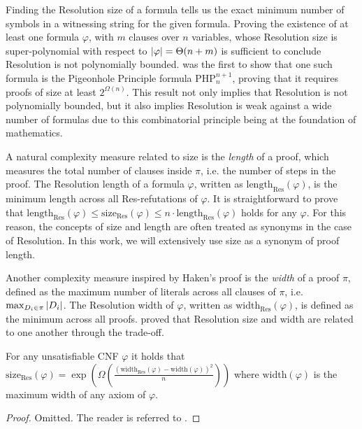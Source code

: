 Finding the Resolution size of a formula tells us the exact minimum number of symbols in a witnessing string for the given formula. Proving the existence of at least one formula $\varphi$, with $m$ clauses over $n$ variables, whose Resolution size is super-polynomial with respect to $\left|\varphi\right| = \Theta(n+m)$ is sufficient to conclude Resolution is not polynomially bounded. \textcite{haken} was the first to show that one such formula is the Pigeonhole Principle formula $\mathrm{PHP}^{n+1}_{n}$, proving that it requires proofs of size at least $2^{\Omega(n)}$. This result not only implies that Resolution is not polynomially bounded, but it also implies Resolution is weak against a wide number of formulas due to this combinatorial principle being at the foundation of mathematics. 

A natural complexity measure related to size is the \textit{length} of a proof, which measures the total number of clauses inside $\pi$, i.e. the number of steps in the proof. The Resolution length of a formula $\varphi$, written as $\mathrm{length}_{\mathrm{Res}}(\varphi)$, is the minimum length across all Res-refutations of $\varphi$. It is straightforward to prove that $\mathrm{length}_{\mathrm{Res}}(\varphi) \leq \mathrm{size}_{\mathrm{Res}}(\varphi) \leq n \cdot \mathrm{length}_{\mathrm{Res}}(\varphi)$ holds for any $\varphi$. For this reason, the concepts of size and length are often treated as synonyms in the case of Resolution. In this work, we will extensively use size as a synonym of proof length.

Another complexity measure inspired by Haken's proof is the \textit{width} of a proof $\pi$, defined as the maximum number of literals across all clauses of $\pi$, i.e. $\max_{D_i \in \pi} \left|D_i\right|$. The Resolution width of $\varphi$, written as $\mathrm{width}_{\mathrm{Res}}(\varphi)$, is defined as the minimum across all proofs. \textcite{bs_wigder} proved that Resolution size and width are related to one another through the trade-off.

\begin{theorem}
    For any unsatisfiable CNF $\varphi$ it holds that $\mathrm{size}_{\mathrm{Res}}(\varphi) = \exp \left (\Omega \left (\frac{(\mathrm{width}_{\mathrm{Res}}(\varphi) - \mathrm{width}(\varphi))^2}{n}\right ) \right )$ where $\mathrm{width}(\varphi)$ is the maximum width of any axiom of $\varphi$.
\end{theorem}

\begin{proof}
    Omitted. The reader is referred to \cite{bs_wigder}.
\end{proof}

